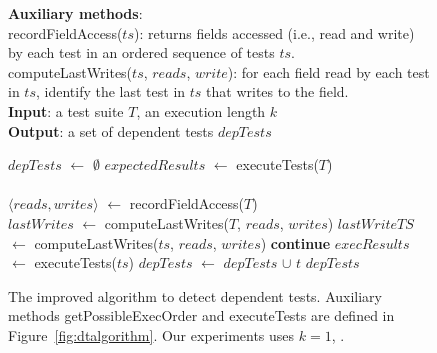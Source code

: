 \begin{figure}[t]
\textbf{Auxiliary methods}:\\
recordFieldAccess($ts$): returns fields accessed (i.e., read and write) by each test in an ordered sequence of tests $ts$. \\
computeLastWrites($ts$, $reads$, $write$): for each field read by each test in $ts$, identify the last test in $ts$ that writes to the field.\\
\textbf{Input}: a test suite $\mathit{T}$, an execution length $\mathit{k}$\\
\textbf{Output}: a set of dependent tests $\mathit{depTests}$\\
\vspace{-5mm}
\begin{algorithmic}[1]
\STATE $\mathit{depTests}$ $\leftarrow$ $\emptyset$
\STATE $\mathit{expectedResults}$ $\leftarrow$ executeTests($T$)\\
\\
\STATE $\langle reads, writes\rangle$ $\leftarrow$ recordFieldAccess($T$)
\\
\STATE $\mathit{lastWrites}$ $\leftarrow$ computeLastWrites($T$, $\mathit{reads}$, $\mathit{writes}$)
\STATE $\mathit{lastWriteTS}$ $\leftarrow$ computeLastWrites($ts$, $\mathit{reads}$, $\mathit{writes}$)
\vspace{-3mm}
\STATE \textbf{continue}
\ENDIF
\STATE $\mathit{execResults}$ $\leftarrow$ executeTests($\mathit{ts}$)
\STATE $\mathit{depTests}$ $\leftarrow$ $\mathit{depTests}$ $\cup$ $\mathit{t}$
\ENDIF
\ENDFOR
\ENDFOR
\RETURN $\mathit{depTests}$
\end{algorithmic}
\vspace{-3mm}
\caption {The improved algorithm to detect dependent tests.
Auxiliary methods getPossibleExecOrder and executeTests are
defined in Figure~\ref{fig:dtalgorithm}.
Our experiments uses $k=1$, . } 
\label{fig:impralg}
\end{figure}

